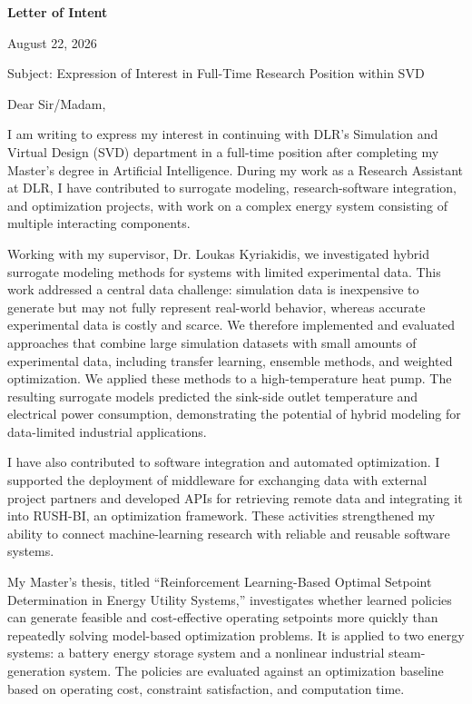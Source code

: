 \documentclass[11pt,a4paper]{article}
\begin{document}
{\bfseries\fontsize{26pt}{32pt}\selectfont
\color{lettertitle}Letter of Intent\par}

\vspace{16pt}
{\setlength{\fboxsep}{3pt}
\colorbox{datechip}{August 22, 2026}\par}

\vspace{18pt}
Subject: Expression of Interest in Full-Time Research Position within SVD

\vspace{14pt}
Dear Sir/Madam,

\vspace{12pt}
I am writing to express my interest in continuing with DLR's Simulation and
Virtual Design (SVD) department in a full-time position after completing my
Master's degree in Artificial Intelligence. During my work as a Research
Assistant at DLR, I have contributed to surrogate modeling, research-software
integration, and optimization projects, with work on a complex energy
system consisting of multiple interacting components.

\vspace{10pt}
Working with my supervisor, Dr. Loukas Kyriakidis, we investigated hybrid surrogate
modeling methods for systems with limited experimental data. This work addressed
a central data challenge: simulation data is inexpensive to generate but may not
fully represent real-world behavior, whereas accurate experimental data is costly
and scarce. We therefore implemented and evaluated approaches that combine large
simulation datasets with small amounts of experimental data, including transfer
learning, ensemble methods, and weighted optimization.
We applied these methods to a high-temperature heat pump. The resulting surrogate models
predicted the sink-side outlet temperature and electrical power consumption,
demonstrating the potential of hybrid modeling for data-limited industrial applications.

\vspace{10pt} 
I have also contributed to software integration and automated optimization.
I supported the deployment of middleware for exchanging data with
external project partners and developed APIs for retrieving remote data and
integrating it into RUSH-BI, an optimization framework. These activities strengthened my
ability to connect machine-learning research with reliable and reusable
software systems.

\vspace{10pt}
My Master's thesis, titled ``Reinforcement Learning-Based Optimal Setpoint Determination in Energy Utility Systems,'' investigates whether learned
policies can generate feasible and cost-effective operating setpoints more
quickly than repeatedly solving model-based optimization problems. It is applied to two energy systems: a
battery energy storage system and a nonlinear industrial steam-generation
system. The policies are evaluated against an optimization baseline based on
operating cost, constraint satisfaction, and computation time.
\end{document}
